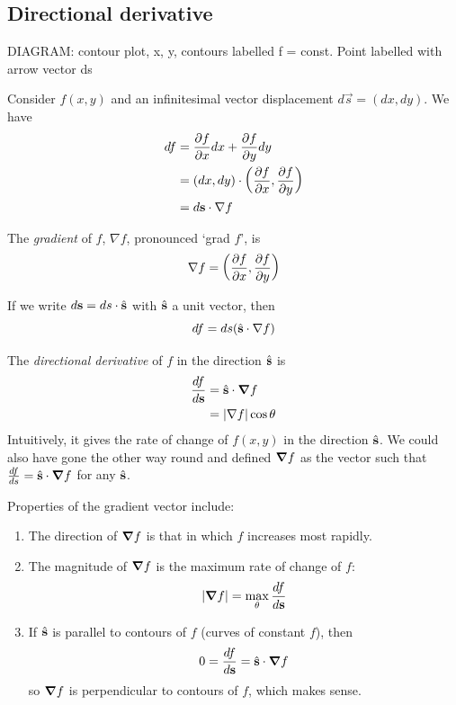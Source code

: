 \documentclass{../template/note}
\begin{document}
    \subsection{Directional derivative}

    DIAGRAM: contour plot, x, y, contours labelled f = const. Point labelled with arrow vector ds

    Consider \(f(x, y)\) and an infinitesimal vector displacement \(d \vec s = (dx, dy)\). We have
    \begin{align*}
        df &= \pd f x dx + \pd f y dy \\
        &= (dx, dy) \cdot \left(\pd f x, \pd f y\right) \\
        &= d \vec s \cdot \nabla f
    \end{align*}
    
    \begin{definition}
        The \emph{gradient} of \(f\), \(\nabla f\), pronounced `grad \(f\)', is
        \[
            \nabla f = \left(\pd f x, \pd f y\right)
        \]  
    \end{definition}
    If we write \(d \vec s = ds \cdot \hvec s\) with \(\hvec s\) a unit vector, then
    \[
        df = ds (\hvec s \cdot \nabla f)
    \]
    \begin{definition}
        The \emph{directional derivative} of \(f\) in the direction \(\hvec s\) is
        \begin{align*}
            \frac{df}{d\vec s} &= \hvec s \cdot \grad f \\
            &= |\nabla f|\cos \theta 
        \end{align*}
        Intuitively, it gives the rate of change of \(f(x, y)\) in the direction \(\hvec s\). We could also have gone the other way round and defined \(\grad f\) as the vector such that \(\frac{df}{ds} = \hvec s \cdot \grad f\) for any \(\hvec s\).
    \end{definition}
    
    Properties of the gradient vector include:
    \begin{enumerate}[label=\protect\circled{\arabic*}]
        \item The direction of \(\grad f\) is that in which \(f\) increases most rapidly.
        \item The magnitude of \(\grad f\) is the maximum rate of change of \(f\):
        \[
            |\grad f| = \max_{\theta} \frac{df}{d\vec s}
        \]
        \item If \(\hvec s\) is parallel to contours of \(f\) (curves of constant \(f\)), then
        \begin{align*}
            0 = \frac{df}{d \vec s} = \hvec s \cdot \grad f
        \end{align*}
        so \(\grad f\) is perpendicular to contours of \(f\), which makes sense.
    \end{enumerate}
    
\end{document}
